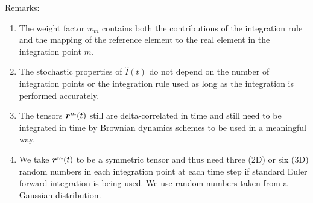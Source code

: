 Remarks:
\begin{enumerate}[1.]
  \item The weight factor $w_m$ contains both the contributions of the
        integration rule and the mapping of the reference element to the real
        element in the integration point $m$.
  \item The stochastic properties of $\hat I(t)$ do not depend on the number of
integration points or the integration rule used as long as the integration is
performed accurately.
  \item The tensors $\boldsymbol{r}^m(t)$ still are delta-correlated in time and still
    need to be integrated in time by Brownian dynamics schemes
    to be used in a meaningful way.
  \item We take $\boldsymbol{r}^m(t)$ to be a symmetric tensor and thus need three
(2D) or six (3D) random numbers in each integration point at each time step
if standard Euler forward integration is being used.
We use random numbers taken from a Gaussian distribution.
\end{enumerate}

